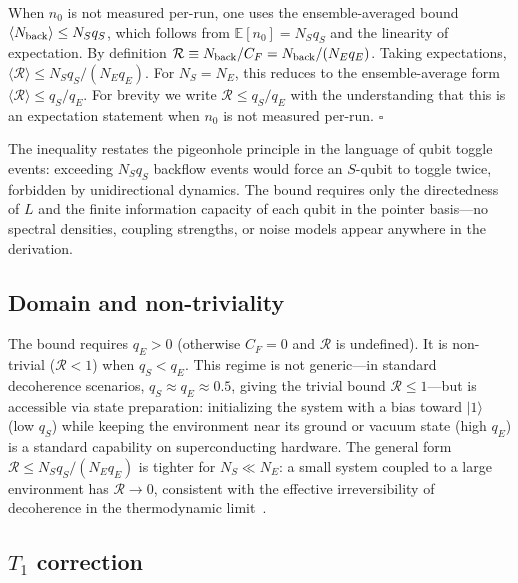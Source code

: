 \documentclass[aps,pra,twocolumn,superscriptaddress,floatfix]{revtex4-2}
\begin{document}
When $n_0$ is not measured per-run, one uses the ensemble-averaged bound $\langle N_{\rm back}\rangle \leq N_S q_S$, which follows from $\mathbb{E}[n_0] = N_S q_S$ and the linearity of expectation. By definition $\mathcal{R} \equiv N_{\rm back}/C_F = N_{\rm back}/(N_E q_E)$. Taking expectations, $\langle\mathcal{R}\rangle \leq N_S q_S/(N_E q_E)$. For $N_S = N_E$, this reduces to the ensemble-average form $\langle\mathcal{R}\rangle \leq q_S/q_E$. For brevity we write $\mathcal{R} \leq q_S/q_E$ with the understanding that this is an expectation statement when $n_0$ is not measured per-run. $\square$

The inequality restates the pigeonhole principle in the language of qubit toggle events: exceeding $N_S q_S$ backflow events would force an $S$-qubit to toggle twice, forbidden by unidirectional dynamics. The bound requires only the directedness of $L$ and the finite information capacity of each qubit in the pointer basis---no spectral densities, coupling strengths, or noise models appear anywhere in the derivation.

\subsection{Domain and non-triviality}

The bound requires $q_E > 0$ (otherwise $C_F = 0$ and $\mathcal{R}$ is undefined). It is non-trivial ($\mathcal{R} < 1$) when $q_S < q_E$. This regime is not generic---in standard decoherence scenarios, $q_S \approx q_E \approx 0.5$, giving the trivial bound $\mathcal{R} \leq 1$---but is accessible via state preparation: initializing the system with a bias toward $|1\rangle$ (low $q_S$) while keeping the environment near its ground or vacuum state (high $q_E$) is a standard capability on superconducting hardware. The general form $\mathcal{R} \leq N_S q_S/(N_E q_E)$ is tighter for $N_S \ll N_E$: a small system coupled to a large environment has $\mathcal{R} \to 0$, consistent with the effective irreversibility of decoherence in the thermodynamic limit~\cite{Breuer:2016}.

\subsection{$T_1$ correction}
\label{sec:T1}
\end{document}
